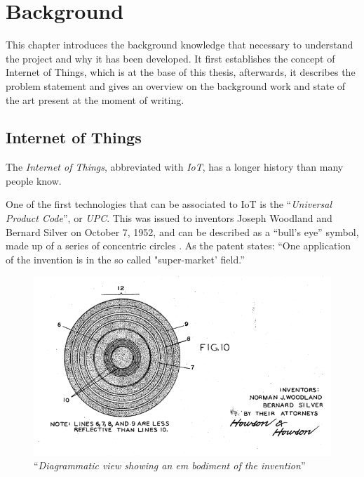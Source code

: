 
\chapter{Background}\label{chapter:background}

This chapter introduces the background knowledge that necessary to understand the project and why it has been developed.
It first establishes the concept of Internet of Things, which is at the base of this thesis, afterwards, it describes the problem statement and gives an overview on the background work and state of the art present at the moment of writing.


\section{Internet of Things}

The \textit{Internet of Things}, abbreviated with \textit{IoT}, has a longer history than many people know.


One of the first technologies that can be associated to IoT is the ``\textit{Universal Product Code}'', or \textit{UPC}.
This was issued to inventors Joseph Woodland and Bernard Silver on October 7, 1952, and can be described as a ``bull's eye'' symbol, made up of a series of concentric circles \cite{upc_patent}. 
As the patent states: ``One application of the invention is in the so called "super-market' field.''

\begin{figure}
	\centering
	\includegraphics[width=\textwidth-3cm]{resources/img/upc_1}
	\caption{``\textit{Diagrammatic view showing an em bodiment of the invention}''}
\end{figure}

